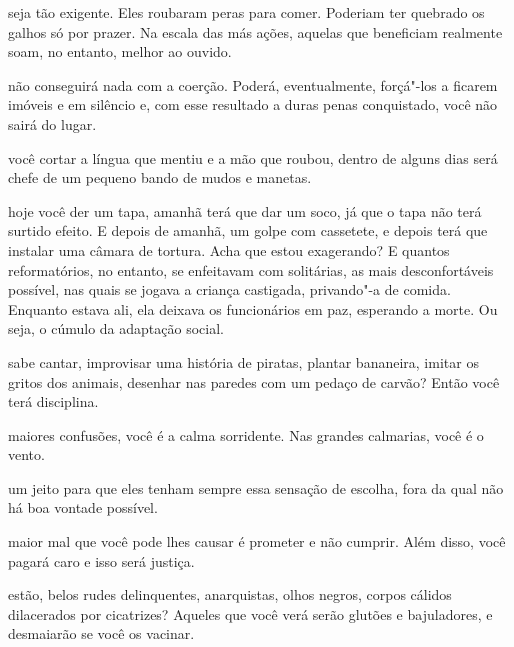 \bigskip
\bigskip

 seja tão exigente. Eles roubaram peras para comer. Poderiam ter
quebrado os galhos só por prazer. Na escala das más ações, aquelas que
beneficiam realmente soam, no entanto, melhor ao ouvido.

\bigskip
\bigskip

 não conseguirá nada com a coerção. Poderá, eventualmente, forçá"-los
a ficarem imóveis e em silêncio e, com esse resultado a duras penas
conquistado, você não sairá do lugar.

\bigskip
\bigskip

 você cortar a língua que mentiu e a mão que roubou, dentro de alguns
dias será chefe de um pequeno bando de mudos e manetas.

\bigskip
\bigskip

 hoje você der um tapa, amanhã terá que dar um soco, já que o tapa não
terá surtido efeito. E depois de amanhã, um golpe com cassetete, e
depois terá que instalar uma câmara de tortura. Acha que estou
exagerando? E quantos reformatórios, no entanto, se enfeitavam com
solitárias, as mais desconfortáveis possível, nas quais se jogava a
criança castigada, privando"-a de comida. Enquanto estava ali, ela
deixava os funcionários em paz, esperando a morte. Ou seja, o cúmulo da
adaptação social.

\bigskip
\bigskip

 sabe cantar, improvisar uma história de piratas, plantar bananeira,
imitar os gritos dos animais, desenhar nas paredes com um pedaço de
carvão? Então você terá disciplina.

\bigskip
\bigskip

 maiores confusões, você é a calma sorridente. Nas grandes calmarias,
você é o vento.

\bigskip
\bigskip

 um jeito para que eles tenham sempre essa sensação de escolha, fora
da qual não há boa vontade possível.

\bigskip
\bigskip

 maior mal que você pode lhes causar é prometer e não cumprir. Além
disso, você pagará caro e isso será justiça.

\bigskip
\bigskip

 estão, belos rudes delinquentes, anarquistas, olhos negros, corpos
cálidos dilacerados por cicatrizes? Aqueles que você verá serão glutões
e bajuladores, e desmaiarão se você os vacinar.


